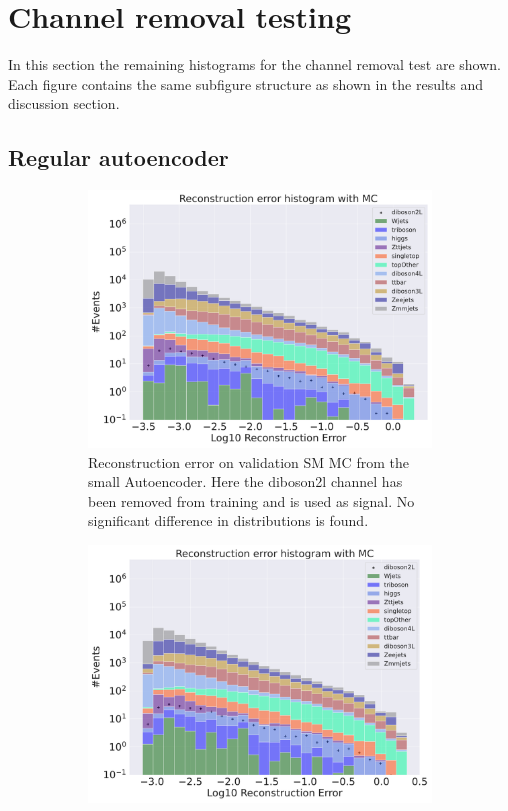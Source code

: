\section{Channel removal testing}\label{sec:app2}
In this section the remaining histograms for the channel removal test are shown. Each figure contains the 
same subfigure structure as shown in the results and discussion section. 
\subsection*{Regular autoencoder}

\begin{figure}[H]
    \centering
    \begin{subfigure}{.45\textwidth}
        \includegraphics[width=\textwidth]{Figures/AE_testing/small/b_data_recon_big_rm3_feats_sig_diboson2l.pdf}
        \caption{Reconstruction error on validation SM MC from the small Autoencoder. Here the diboson2l channel has been removed from training and 
        is used as signal. No significant difference in distributions is found.}
        \label{fig:ae_small_diboson2l}
    \end{subfigure}
    \hfill 
    \begin{subfigure}{.45\textwidth}
        \includegraphics[width=\textwidth]{Figures/AE_testing/big/b_data_recon_big_rm3_feats_sig_diboson2l.pdf}

\end{subfigure}
\end{figure}
